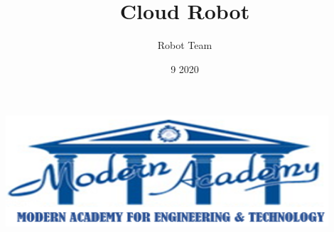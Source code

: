 \documentclass[12pt,A4]{article}
\title{Cloud Robot}
\author{Robot Team}
\date{9 2020}
\begin{document}
\begin{titlepage}
\maketitle
\end{titlepage}

\includegraphics[width=0.9\textwidth]{image1}
%

\tableofcontents



\listoffigures
\listoftables









\printbibliography
\end{document}
